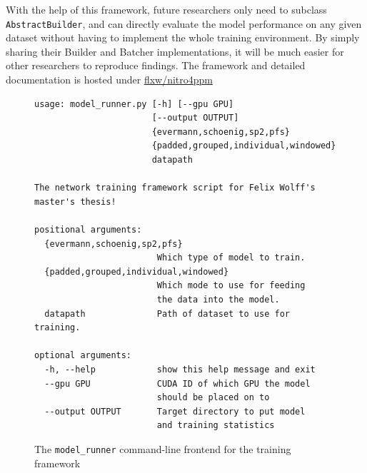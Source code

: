 
With the help of this framework, future researchers only need to subclass \verb=AbstractBuilder=, and can directly evaluate the model performance on any given dataset without having to implement the whole training environment. By simply sharing their Builder and Batcher implementations, it will be much easier for other researchers to reproduce findings. The framework and detailed documentation is hosted under \href{https://github.com/flxw/nitro4ppm}{flxw/nitro4ppm}

\begin{figure}
\centering
\begin{verbatim}
usage: model_runner.py [-h] [--gpu GPU]
                       [--output OUTPUT]
                       {evermann,schoenig,sp2,pfs}
                       {padded,grouped,individual,windowed}
                       datapath

The network training framework script for Felix Wolff's master's thesis!

positional arguments:
  {evermann,schoenig,sp2,pfs}
                        Which type of model to train.
  {padded,grouped,individual,windowed}
                        Which mode to use for feeding
                        the data into the model.
  datapath              Path of dataset to use for training.

optional arguments:
  -h, --help            show this help message and exit
  --gpu GPU             CUDA ID of which GPU the model
                        should be placed on to
  --output OUTPUT       Target directory to put model
                        and training statistics
\end{verbatim}
\caption[CLI frontend for the framework]{The \texttt{model\_runner} command-line frontend for the training framework}
\label{fig:framework-frontend}
\end{figure}
